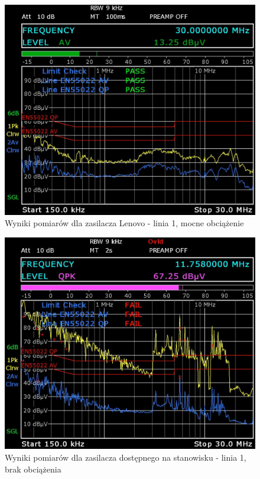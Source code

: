 \documentclass[12pt, a4paper, oneside]{article}
\begin{document}
\clearpage
\begin{figure}[t]
\centering
\caption{Wyniki pomiarów dla zasilacza Lenovo - linia 1, mocne obciążenie}
\includegraphics[scale=0.34]{Linia1/k3.png}
\end{figure}
\begin{figure}[b]
\centering
\caption{Wyniki pomiarów dla zasilacza dostępnego na stanowisku - linia 1, brak obciążenia}
\includegraphics[scale=0.34]{Linia1/stary_k1.png}
\end{figure}
\clearpage
\end{document}

